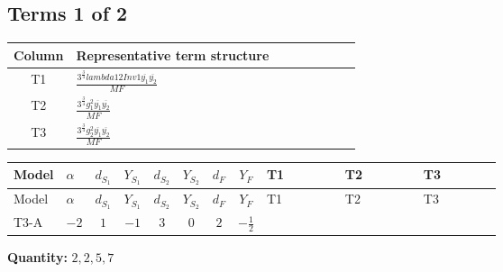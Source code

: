 \documentclass[8pt]{article}
\begin{document}
\begin{landscape}
\subsection*{Terms 1 of 2}
\begin{center}
\begin{tabular}{@{}c >{\raggedright\arraybackslash}p{0.82\linewidth}@{}}
\toprule
Column & Representative term structure \\
\midrule
T1 & \(\displaystyle \frac{3^{\frac{3}{4}} lambda12Inv1 \overline{y_{1}} \overline{y_{2}}}{MF}\) \\
\midrule
T2 & \(\displaystyle \frac{3^{\frac{3}{4}} g_{1}^{2} \overline{y_{1}} \overline{y_{2}}}{MF}\) \\
\midrule
T3 & \(\displaystyle \frac{3^{\frac{3}{4}} g_{2}^{2} \overline{y_{1}} \overline{y_{2}}}{MF}\) \\
\midrule
\bottomrule
\end{tabular}
\end{center}
\smallskip
\tiny
\begin{longtable}{@{}llcccccc >{\raggedright\arraybackslash}p{0.21\linewidth} >{\raggedright\arraybackslash}p{0.21\linewidth} >{\raggedright\arraybackslash}p{0.21\linewidth}@{}}
\toprule
Model & $\alpha$ & $d_{S_1}$ & $Y_{S_1}$ & $d_{S_2}$ & $Y_{S_2}$ & $d_F$ & $Y_F$ & T1 & T2 & T3 \\
\midrule
\endfirsthead
\toprule
Model & $\alpha$ & $d_{S_1}$ & $Y_{S_1}$ & $d_{S_2}$ & $Y_{S_2}$ & $d_F$ & $Y_F$ & T1 & T2 & T3 \\
\midrule
\endhead
T3-A & $-2$ & $1$ & $-1$ & $3$ & $0$ & $2$ & $-\frac{1}{2}$ & \scriptsize\adjustbox{max width=\linewidth}{$\begin{gathered} \frac{3^{\frac{3}{4}} lambda12Inv1 \overline{y_{1}} \overline{y_{2}}}{6 MF}\end{gathered}$} & \scriptsize\adjustbox{max width=\linewidth}{$\begin{gathered} \frac{3^{\frac{3}{4}} g_{1}^{2} \overline{y_{1}} \overline{y_{2}}}{8 MF}\end{gathered}$} & \scriptsize\adjustbox{max width=\linewidth}{$\begin{gathered} \frac{17 \cdot 3^{\frac{3}{4}} g_{2}^{2} \overline{y_{1}} \overline{y_{2}}}{24 MF}\end{gathered}$} \\
\midrule
\bottomrule
\end{longtable}
\clearpage
\noindent\textbf{Quantity: }$\mathrm{2,2,5,7}$\par\smallskip

\end{landscape}
\end{document}
